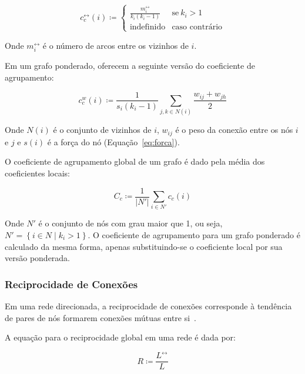 \documentclass[12pt,a4paper]{article}
\theoremstyle{hypo}
\newcommand{\defn}{\coloneqq} %
\newcommand{\linkboth}[1]{#1^\leftrightarrow} %
\newcommand{\weighted}[1]{#1^w} %
\begin{document}
\begin{equation}
\linkboth{c}_c(i) \defn \begin{cases}
    \frac{\linkboth{m}_i}{k_i(k_i - 1)} & \text{se}\ k_i > 1 \\
    \text{indefinido}                  & \text{caso contrário}
  \end{cases}
\end{equation}

Onde $\linkboth{m}_i$ é o número de arcos entre os vizinhos de $i$.

Em um grafo ponderado,  oferecem a seguinte versão do coeficiente de agrupamento:

\begin{equation}
\weighted{c}_c(i) \defn \frac{1}{s_i(k_i - 1)} \sum_{j,k \in N(i)} \frac{w_{ij} + w_{jh}}{2}
\end{equation}

Onde $N(i)$ é o conjunto de vizinhos de $i$, $w_{ij}$ é o peso da conexão entre os nós $i$ e $j$ e $s(i)$ é a força do nó (Equação~\ref{eq:forca}).

O coeficiente de agrupamento global de um grafo é dado pela média dos coeficientes locais:

\begin{equation}
C_c \defn \frac{1}{|N'|} \sum_{i \in N'} c_c(i)
\end{equation}

Onde $N'$ é o conjunto de nós com grau maior que 1, ou seja, $N' = \left\lbrace i \in N \mid k_i > 1 \right\rbrace$. O coeficiente de agrupamento para um grafo ponderado é calculado da mesma forma, apenas substituindo-se o coeficiente local por sua versão ponderada.

\subsubsection{Reciprocidade de Conexões} \label{sec:reciprocidade}

Em uma rede direcionada, a reciprocidade de conexões corresponde à tendência de pares de nós formarem conexões mútuas entre si~\cite{Garlaschelli2004-db}.

A equação para o reciprocidade global em uma rede é dada por:

\begin{equation} \label{eq:reciprocidade}
R \defn \frac{\linkboth{L}}{L}
\end{equation}
\end{document}
